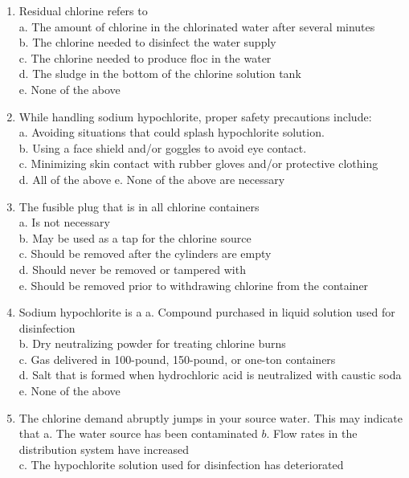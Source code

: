 \begin{enumerate}[1.]
\item Residual chlorine refers to\\
a. The amount of chlorine in the chlorinated water after several minutes\\
b. The chlorine needed to disinfect the water supply\\
c. The chlorine needed to produce floc in the water\\
d. The sludge in the bottom of the chlorine solution tank\\
e. None of the above\\
\item While handling sodium hypochlorite, proper safety precautions include:\\
a. Avoiding situations that could splash hypochlorite solution.\\
b. Using a face shield and/or goggles to avoid eye contact.\\
c. Minimizing skin contact with rubber gloves and/or protective clothing\\
d. All of the above e. None of the above are necessary\\
\item The fusible plug that is in all chlorine containers\\
a. Is not necessary\\
b. May be used as a tap for the chlorine source\\
c. Should be removed after the cylinders are empty\\
d. Should never be removed or tampered with\\
e. Should be removed prior to withdrawing chlorine from the container\\
\item Sodium hypochlorite is a a. Compound purchased in liquid solution used for disinfection\\
b. Dry neutralizing powder for treating chlorine burns\\
c. Gas delivered in 100-pound, 150-pound, or one-ton containers\\
d. Salt that is formed when hydrochloric acid is neutralized with caustic soda\\
e. None of the above\\
\item The chlorine demand abruptly jumps in your source water. This may indicate that a. The water source has been contaminated $b$. Flow rates in the distribution system have increased\\
c. The hypochlorite solution used for disinfection has deteriorated\\

\end{enumerate}
